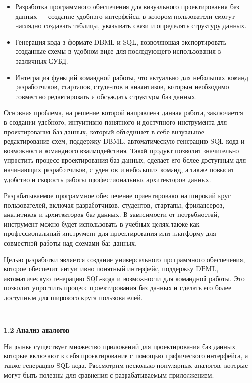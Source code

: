 \begin{itemize}
    \item Разработка программного обеспечения для визуального проектирования баз данных — создание удобного интерфейса, в котором пользователи смогут наглядно создавать таблицы, указывать связи и определять структуру данных.
    \item Генерация кода в формате DBML и SQL, позволяющая экспортировать созданные схемы в удобном виде для последующего использования в различных СУБД.
    \item Интеграция функций командной работы, что актуально для небольших команд разработчиков, стартапов, студентов и аналитиков, которым необходимо совместно редактировать и обсуждать структуры баз данных.
\end{itemize}

Основная проблема, на решение которой направлена данная работа, заключается в создании удобного, интуитивно понятного и доступного инструмента для проектирования баз данных, который объединяет в себе визуальное редактирование схем, поддержку DBML, автоматическую генерацию SQL-кода и возможности командного взаимодействия. Такой продукт позволит значительно упростить процесс проектирования баз данных, сделает его более доступным для начинающих разработчиков, студентов и небольших команд, а также повысит удобство и скорость работы профессиональных архитекторов данных.

Разрабатываемое программное обеспечение ориентировано на широкий круг пользователей, включая разработчиков, студентов, стартапы, фрилансеров, аналитиков и архитекторов баз данных. В зависимости от потребностей, инструмент можно будет использовать в учебных целях,также как профессиональный инструмент для проектирования или платформу для совместной работы над схемами баз данных.

Целью разработки является создание универсального программного обеспечения, которое обеспечит интуитивно понятный интерфейс, поддержку DBML, автоматическую генерацию SQL-кода и возможности для командной работы. Это позволит упростить процесс проектирования баз
данных и сделать его более доступным для широкого круга пользователей.

\

\textbf{\large 1.2 Анализ аналогов}

На рынке существует множество приложений для проектирования баз данных, которые включают в себя проектирование с помощью графического интерфейса, а также генерацию SQL-кода. Рассмотрим несколько популярных аналогов, которые могут быть полезны для сравнения с разрабатываемым прилолжением.

